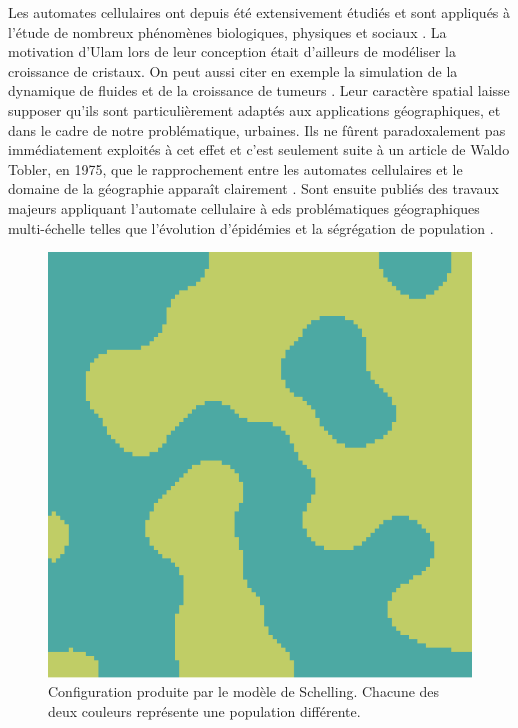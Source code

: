 \documentclass[12pt]{article}
\begin{document}
Les automates cellulaires ont depuis été extensivement étudiés et sont
appliqués à l'étude de nombreux phénomènes biologiques, physiques et
sociaux \cite{Ganguly2003}. La motivation d'Ulam lors de leur
conception était d'ailleurs de modéliser la croissance de cristaux. On
peut aussi citer en exemple la simulation de la dynamique de fluides
\cite{Frisch1986} et de la croissance de tumeurs
\cite{Kansal2000}. Leur caractère spatial laisse supposer qu'ils sont
particulièrement adaptés aux applications géographiques, et dans le
cadre de notre problématique, urbaines. Ils ne fûrent paradoxalement
pas immédiatement exploités à cet effet et c'est seulement suite à un
article de Waldo Tobler, en 1975, que le rapprochement entre les
automates cellulaires et le domaine de la géographie apparaît
clairement \cite{Tobler1975}. Sont ensuite publiés des travaux majeurs
appliquant l'automate cellulaire à eds problématiques géographiques
multi-échelle telles que l'évolution d'épidémies \cite{Fu2003} et la
ségrégation de population \cite{Schelling1969}.

\begin{figure}
  \centering
  \includegraphics[width=.6\linewidth]{images/schelling.png}
  \caption{Configuration produite par le modèle de Schelling. Chacune
    des deux couleurs représente une population différente.}
  \label{fig:schelling}
\end{figure}
\end{document}
